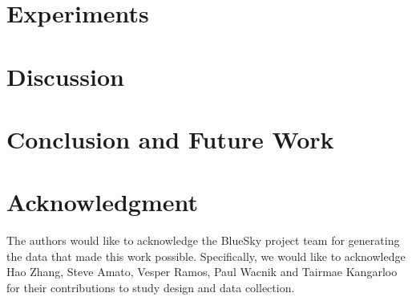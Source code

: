 \documentclass[sensors,article,submit,moreauthors,pdftex]{Definitions/mdpi}
\begin{document}
\section{Experiments} \label{sec:experiment}

\section{Discussion} \label{sec:discussion}

\section{Conclusion and Future Work} \label{sec:conclusion}

\section*{Acknowledgment}
The authors would like to acknowledge the BlueSky project team for generating the data that made this work possible. Specifically, we would like to acknowledge Hao Zhang, Steve Amato, Vesper Ramos, Paul Wacnik and Tairmae Kangarloo for their contributions to study design and data collection.



{\small


}



\end{document}

